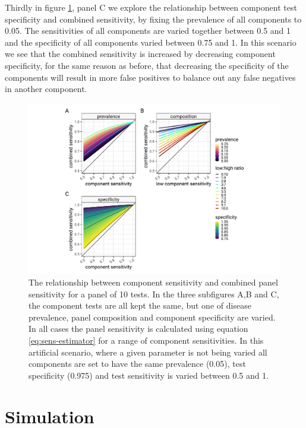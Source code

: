 \documentclass[a4paper, 12pt, twoside]{article}
\let\Oldsection\section
\renewcommand{\section}{\FloatBarrier\Oldsection}
\begin{document}
Thirdly in figure \ref{fig:A2}, panel C we explore the relationship between component test specificity and combined sensitivity, by fixing the prevalence of all components to 0.05. The sensitivities of all components are varied together between 0.5 and 1 and the specificity of all components varied between 0.75 and 1. In this scenario we see that the combined sensitivity is increased by decreasing component specificity, for the same reason as before, that decreasing the specificity of the components will result in more false positives to balance out any false negatives in another component.

\begin{figure}[h!]
\centering
  \includegraphics{fig/component-vs-combined-specificity.png}
  \caption{The relationship between component sensitivity and combined panel sensitivity for a panel of 10 tests. In the three subfigures A,B and C, the component tests are all kept the same, but one of disease prevalence, panel composition and component specificity are varied. In all cases the panel sensitivity is calculated using equation \eqref{eq:sens-estimator} for a range of component sensitivities. In this artificial scenario, where a given parameter is not being varied all components are set to have the same prevalence (0.05), test specificity (0.975) and test sensitivity is varied between 0.5 and 1.}
\label{fig:A2}
\end{figure}

\section{Simulation}
\end{document}
